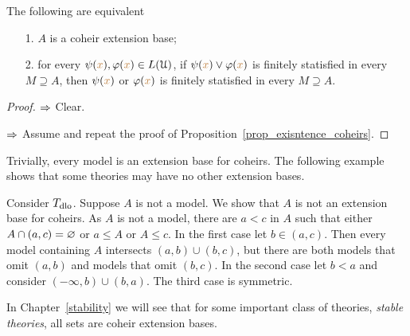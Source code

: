 \documentclass[creche.tex]{subfiles}
\begin{document}
\begin{proposition}\label{prop_exisntence_coheirs_over_sets}
  The following are equivalent
  \begin{itemize}
    \item[1.] $A$ is a coheir extension base;
    \item[2.] for every $\psi({\color{brown} x}),\varphi({\color{brown} x})\in L(\EuScript U)$, if $\psi({\color{brown} x})\vee\varphi({\color{brown} x})$ is finitely statisfied in every $M\supseteq A$, then $\psi({\color{brown} x})$ or $\varphi({\color{brown} x})$ is finitely statisfied in every $M\supseteq A$. 
  \end{itemize}  
\end{proposition}
  
\begin{proof} 
  $\Rightarrow$ Clear.
  
  $\Rightarrow$ Assume  and repeat the proof of Proposition~\ref{prop_exisntence_coheirs}.
\end{proof}
  
Trivially, every model is an extension base for coheirs.
The following example shows that some theories may have no other extension bases.

\begin{example}
  Consider $T_{\rm dlo}$.
  Suppose $A$ is not a model.
  We show that $A$ is not an extension base for coheirs.
  As $A$ is not a model, there are $a<c$ in $A$ such that either $A\cap(a,c)=\varnothing$ or $a\le A$ or $A\le c$.
  In the first case let $b\in(a,c)$. 
  Then every model containing $A$ intersects $(a,b)\cup (b,c)$, but there are both models that omit $(a,b)$ and models that omit $(b,c)$.
  In the second case let $b<a$ and consider $(-\infty,b)\cup (b,a)$.
  The third case is symmetric.\QED
\end{example}

In Chapter~\ref{stability} we will see that for some important class of theories, \textit{stable theories}, all sets are coheir extension bases.
\end{document}

